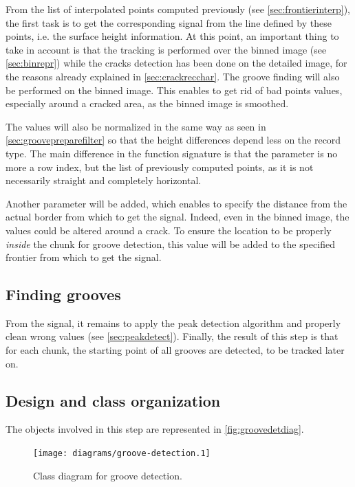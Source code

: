 From the list of interpolated points computed previously (see \autoref{sec:frontierinterp}), the first task is to get the corresponding signal from the line defined by these points, i.e. the surface height information. At this point, an important thing to take in account is that the tracking is performed over the binned image (see \autoref{sec:binrepr}) while the cracks detection has been done on the detailed image, for the reasons already explained in \autoref{sec:crackrecchar}. The groove finding will also be performed on the binned image. This enables to get rid of bad points values, especially around a cracked area, as the binned image is smoothed.

The values will also be normalized in the same way as seen in \autoref{sec:groovepreparefilter} so that the height differences depend less on the record type. The main difference in the function signature is that the parameter is no more a row index, but the list of previously computed points, as it is not necessarily straight and completely horizontal.

Another parameter will be added, which enables to specify the distance from the actual border from which to get the signal. Indeed, even in the binned image, the values could be altered around a crack. To ensure the location to be properly \emph{inside} the chunk for groove detection, this value will be added to the specified frontier from which to get the signal.

\subsection{Finding grooves}

From the signal, it remains to apply the peak detection algorithm and properly clean wrong values (see \autoref{sec:peakdetect}). Finally, the result of this step is that for each chunk, the starting point of all grooves are detected, to be tracked later on.

\subsection{Design and class organization}

The objects involved in this step are represented in \autoref{fig:groovedetdiag}.

\begin{figure}[!ht]
\centering
\texttt{[image: diagrams/groove-detection.1]}
\caption{Class diagram for groove detection.}
\label{fig:groovedetdiag}
\end{figure}

